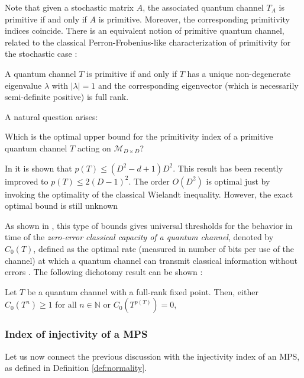 \documentclass[smallextended]{svjour3}
\renewcommand{\1}{\mathbbm{1}}
\newcommand{\N}{\mathbb{N}}
\begin{document}
Note that given a stochastic matrix $A$, the associated quantum channel $T_A$ is primitive if and only if $A$ is primitive. Moreover, the corresponding primitivity indices coincide. There is an equivalent notion of primitive quantum channel, related to the classical Perron-Frobenius-like characterization of primitivity for the stochastic case \cite{qWielandt}:

\begin{proposition}
    A quantum channel $T$ is primitive if and only if $T$ has a unique non-degenerate eigenvalue $\lambda$ with $|\lambda|=1$ and the corresponding eigenvector (which is necessarily semi-definite positive) is full rank.
\end{proposition}

A natural question arises:

\begin{question}
    Which is the optimal upper bound for the primitivity index of a primitive quantum channel $T$ acting on $\mathcal{M}_{D\times D}$?
\end{question}

In \cite{qWielandt} it is shown that $p(T)\le (D^2-d+1)D^2$. This result has been recently improved \cite{Rahaman} to $p(T)\le 2(D-1)^2$. The order $O(D^2)$ is optimal just by invoking the optimality of the classical Wielandt inequality. However, the exact optimal bound is still unknown

As shown in \cite{qWielandt}, this type of bounds gives universal thresholds for the behavior in time of the {\it zero-error classical capacity of a quantum channel}, denoted by $C_0(T)$, defined as the optimal rate (measured in number of bits per use of the channel) at which a quantum channel can transmit classical information without errors \cite{Leung}. The following dichotomy result can be shown \cite{qWielandt}: \\
\begin{proposition}
    Let $T$ be a quantum channel with a full-rank fixed point. Then, either $C_0(T^n)\ge1$ for all $n\in \N$ or $C_0(T^{p(T)})=0$,
\end{proposition}

\subsubsection{Index of injectivity of a MPS}

Let us now connect the previous discussion with the injectivity index of an MPS, as defined in Definition \ref{def:normality}.
\end{document}
